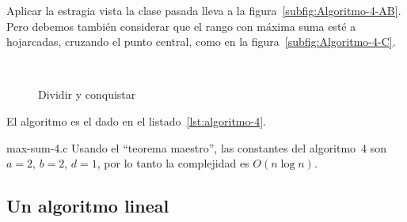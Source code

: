 \documentclass[english, spanish, fleqn, 10pt]{article}
\newcommand{\comillas}[1]{``#1''}
\numberwithin{equation}{section}
\newcommand{\nparentesis}[1]{\left( #1 \right)}
\theoremstyle{definition}
\begin{document}
  Aplicar la estragia vista la clase pasada
  lleva a la figura~\ref{subfig:Algoritmo-4-AB}.
  Pero debemos también considerar que el rango con máxima suma
  esté a hojarcadas,
  cruzando el punto central,
  como en la figura~\ref{subfig:Algoritmo-4-C}.
  \begin{figure}[ht]
    \centering
     \\
    \caption{Dividir y conquistar}
    \label{fig:algoritmo-4}
  \end{figure}
El algoritmo es el dado en el listado~\ref{lst:algoritmo-4}.
  
                  {max-sum-4.c}
Usando el \comillas{teorema maestro}, las constantes del algoritmo~4 son $a=2$, $b=2$, $d=1$, por lo tanto la complejidad es \(O\nparentesis{n \log n}\).

\subsection{Un algoritmo lineal}
\label{sec:algoritmo-5}
\end{document}
